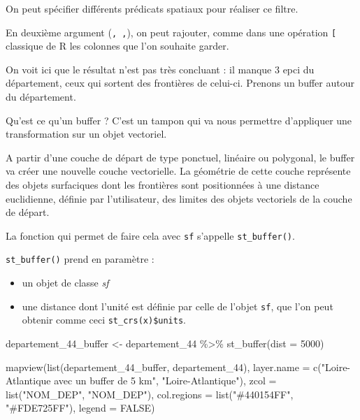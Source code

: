 \documentclass[
]{book}
\newenvironment{Shaded}{\begin{snugshade}}{\end{snugshade}}
\newcommand{\AttributeTok}[1]{\textcolor[rgb]{0.77,0.63,0.00}{#1}}
\newcommand{\ConstantTok}[1]{\textcolor[rgb]{0.00,0.00,0.00}{#1}}
\newcommand{\DecValTok}[1]{\textcolor[rgb]{0.00,0.00,0.81}{#1}}
\newcommand{\FunctionTok}[1]{\textcolor[rgb]{0.00,0.00,0.00}{#1}}
\newcommand{\NormalTok}[1]{#1}
\newcommand{\OtherTok}[1]{\textcolor[rgb]{0.56,0.35,0.01}{#1}}
\newcommand{\SpecialCharTok}[1]{\textcolor[rgb]{0.00,0.00,0.00}{#1}}
\newcommand{\StringTok}[1]{\textcolor[rgb]{0.31,0.60,0.02}{#1}}
\providecommand{\tightlist}{%
  \setlength{\itemsep}{0pt}\setlength{\parskip}{0pt}}
\begin{document}
On peut spécifier différents prédicats spatiaux pour réaliser ce filtre.

En deuxième argument (\texttt{,\ ,}), on peut rajouter, comme dans une opération \texttt{{[}} classique de R les colonnes que l'on souhaite garder.

On voit ici que le résultat n'est pas très concluant : il manque 3 epci du département, ceux qui sortent des frontières de celui-ci.
Prenons un buffer autour du département.

\begin{rmdnote}
Qu'est ce qu'un buffer ? C'est un tampon qui va nous permettre d'appliquer une transformation sur un objet vectoriel.

A partir d'une couche de départ de type ponctuel, linéaire ou polygonal, le buffer va créer une nouvelle couche vectorielle. La géométrie de cette couche représente des objets surfaciques dont les frontières sont positionnées à une distance euclidienne, définie par l'utilisateur, des limites des objets vectoriels de la couche de départ.
\end{rmdnote}

La fonction qui permet de faire cela avec \texttt{sf} s'appelle \texttt{st\_buffer()}.

\texttt{st\_buffer()} prend en paramètre :

\begin{itemize}
\tightlist
\item
  un objet de classe \emph{sf}
\item
  une distance dont l'unité est définie par celle de l'objet \texttt{sf}, que l'on peut obtenir comme ceci \texttt{st\_crs(x)\$units}.
\end{itemize}

\begin{Shaded}
\begin{Highlighting}[]
\NormalTok{departement\_44\_buffer }\OtherTok{\textless{}{-}}\NormalTok{ departement\_44 }\SpecialCharTok{\%\textgreater{}\%}
  \FunctionTok{st\_buffer}\NormalTok{(}\AttributeTok{dist =} \DecValTok{5000}\NormalTok{)}

\FunctionTok{mapview}\NormalTok{(}\FunctionTok{list}\NormalTok{(departement\_44\_buffer, departement\_44), }\AttributeTok{layer.name =} \FunctionTok{c}\NormalTok{(}\StringTok{"Loire{-}Atlantique avec un buffer de 5 km"}\NormalTok{, }\StringTok{"Loire{-}Atlantique"}\NormalTok{), }\AttributeTok{zcol =} \FunctionTok{list}\NormalTok{(}\StringTok{"NOM\_DEP"}\NormalTok{, }\StringTok{"NOM\_DEP"}\NormalTok{), }\AttributeTok{col.regions =} \FunctionTok{list}\NormalTok{(}\StringTok{"\#440154FF"}\NormalTok{, }\StringTok{"\#FDE725FF"}\NormalTok{), }\AttributeTok{legend =} \ConstantTok{FALSE}\NormalTok{)}
\end{Highlighting}
\end{Shaded}
\end{document}

